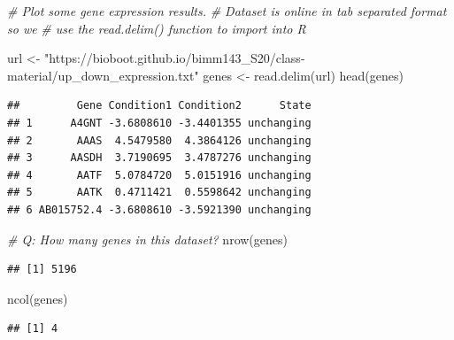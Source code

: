 \documentclass[
]{article}
\newenvironment{Shaded}{\begin{snugshade}}{\end{snugshade}}
\newcommand{\CommentTok}[1]{\textcolor[rgb]{0.56,0.35,0.01}{\textit{#1}}}
\newcommand{\FunctionTok}[1]{\textcolor[rgb]{0.00,0.00,0.00}{#1}}
\newcommand{\NormalTok}[1]{#1}
\newcommand{\OtherTok}[1]{\textcolor[rgb]{0.56,0.35,0.01}{#1}}
\newcommand{\SpecialCharTok}[1]{\textcolor[rgb]{0.00,0.00,0.00}{#1}}
\newcommand{\StringTok}[1]{\textcolor[rgb]{0.31,0.60,0.02}{#1}}
\begin{document}
\begin{Shaded}
\begin{Highlighting}[]
\CommentTok{\# Plot some gene expression results.}
\CommentTok{\# Dataset is online in tab separated format so we}
\CommentTok{\# use the read.delim() function to import into R}

\NormalTok{url }\OtherTok{\textless{}{-}} \StringTok{"https://bioboot.github.io/bimm143\_S20/class{-}material/up\_down\_expression.txt"}
\NormalTok{genes }\OtherTok{\textless{}{-}} \FunctionTok{read.delim}\NormalTok{(url)}
\FunctionTok{head}\NormalTok{(genes)}
\end{Highlighting}
\end{Shaded}

\begin{verbatim}
##         Gene Condition1 Condition2      State
## 1      A4GNT -3.6808610 -3.4401355 unchanging
## 2       AAAS  4.5479580  4.3864126 unchanging
## 3      AASDH  3.7190695  3.4787276 unchanging
## 4       AATF  5.0784720  5.0151916 unchanging
## 5       AATK  0.4711421  0.5598642 unchanging
## 6 AB015752.4 -3.6808610 -3.5921390 unchanging
\end{verbatim}

\begin{Shaded}
\begin{Highlighting}[]
\CommentTok{\# Q: How many genes in this dataset?}
\FunctionTok{nrow}\NormalTok{(genes)}
\end{Highlighting}
\end{Shaded}

\begin{verbatim}
## [1] 5196
\end{verbatim}

\begin{Shaded}
\begin{Highlighting}[]
\FunctionTok{ncol}\NormalTok{(genes)}
\end{Highlighting}
\end{Shaded}

\begin{verbatim}
## [1] 4
\end{verbatim}

\begin{Shaded}
\end{Shaded}
\end{document}
